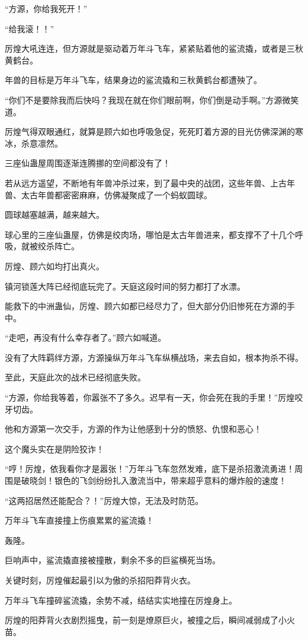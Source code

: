 \begin{this_body}
“方源，你给我死开！”

“给我滚！！”

厉煌大吼连连，但方源就是驱动着万年斗飞车，紧紧贴着他的鲨流撬，或者是三秋黄鹤台。

年兽的目标是万年斗飞车，结果身边的鲨流撬和三秋黄鹤台都遭殃了。

“你们不是要除我而后快吗？我现在就在你们眼前啊，你们倒是动手啊。”方源微笑道。

厉煌气得双眼通红，就算是顾六如也呼吸急促，死死盯着方源的目光仿佛深渊的寒冰，杀意凛然。

三座仙蛊屋周围逐渐连腾挪的空间都没有了！

若从远方遥望，不断地有年兽冲杀过来，到了最中央的战团，这些年兽、上古年兽、太古年兽都密密麻麻，仿佛凝聚成了一个蚂蚁圆球。

圆球越塞越满，越来越大。

球心里的三座仙蛊屋，仿佛是绞肉场，哪怕是太古年兽进来，都支撑不了十几个呼吸，就被绞杀阵亡。

厉煌、顾六如均打出真火。

镇河锁莲大阵已经彻底玩完了。天庭这段时间的努力都打了水漂。

能救下的中洲蛊仙，厉煌、顾六如都已经尽力了，但大部分仍旧惨死在方源的手中。

“走吧，再没有什么幸存者了。”顾六如喊道。

没有了大阵羁绊方源，方源操纵万年斗飞车纵横战场，来去自如，根本拘杀不得。

至此，天庭此次的战术已经彻底失败。

“方源，你给我等着，你嚣张不了多久。迟早有一天，你会死在我的手里！”厉煌咬牙切齿。

他和方源第一次交手，方源的作为让他感到十分的愤怒、仇恨和恶心！

这个魔头实在是阴险狡诈！

“哼！厉煌，依我看你才是嚣张！”万年斗飞车忽然发难，底下是杀招激流勇进！周围是破晓剑！银色的飞剑纷纷扎入激流当中，带来超乎意料的爆炸般的速度！

“这两招居然还能配合？！”厉煌大惊，无法及时防范。

万年斗飞车直接撞上伤痕累累的鲨流撬！

轰隆。

巨响声中，鲨流撬直接被撞散，剩余不多的巨鲨横死当场。

关键时刻，厉煌催起最引以为傲的杀招阳莽背火衣。

万年斗飞车撞碎鲨流撬，余势不减，结结实实地撞在厉煌身上。

厉煌的阳莽背火衣剧烈摇曳，前一刻是燎原巨火，被撞之后，瞬间减弱成了小火苗。


\end{this_body}

